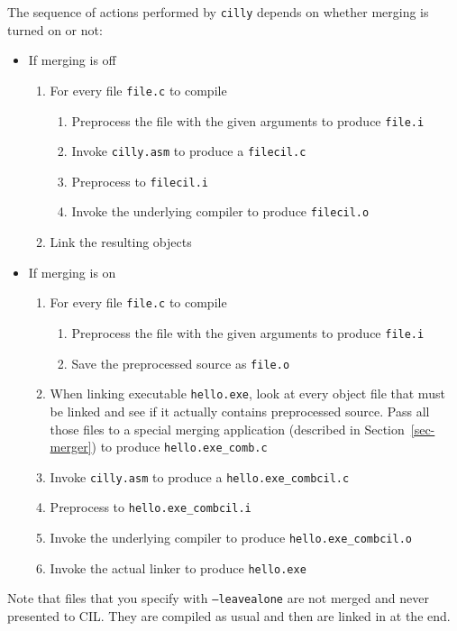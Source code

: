 \documentclass{article}
\def\secref#1{Section~\ref{sec-#1}}
\def\t#1{{\tt #1}}
\begin{document}
 The sequence of actions performed by \t{cilly} depends on whether merging
is turned on or not:
\begin{itemize}
\item If merging is off
  \begin{enumerate}
    \item For every file \t{file.c} to compile
         \begin{enumerate}
            \item Preprocess the file with the given arguments to 
                  produce \t{file.i}
            \item Invoke \t{cilly.asm} to produce a \t{filecil.c}
            \item Preprocess to \t{filecil.i}
            \item Invoke the underlying compiler to produce \t{filecil.o}
         \end{enumerate}
    \item Link the resulting objects
  \end{enumerate}
\item If merging is on
  \begin{enumerate}
    \item For every file \t{file.c} to compile
         \begin{enumerate}
            \item Preprocess the file with the given arguments to 
                  produce \t{file.i}
            \item Save the preprocessed source as \t{file.o}
         \end{enumerate}
    \item When linking executable \t{hello.exe}, look at every object 
          file that must be linked and see if it actually 
          contains preprocessed source. Pass all those files to a 
          special merging application (described in
          \secref{merger}) to produce \t{hello.exe\_comb.c}
    \item Invoke \t{cilly.asm} to produce a \t{hello.exe\_combcil.c}
    \item Preprocess to \t{hello.exe\_combcil.i}
    \item Invoke the underlying compiler to produce \t{hello.exe\_combcil.o}
    \item Invoke the actual linker to produce \t{hello.exe}
  \end{enumerate}
\end{itemize}

 Note that files that you specify with \t{--leavealone} are not merged and
never presented to CIL. They are compiled as usual and then are linked in at
the end. 
\end{document}
